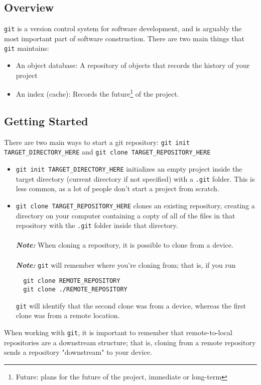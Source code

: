 \documentclass[13pt]{article}
\begin{document}
\subsection{Overview}
\texttt{git} is a version control system for software development, and is arguably the most important part of software construction. There are two main things that \texttt{git} maintains:
\begin{itemize}[label=,leftmargin=*]
\item An object database: A repository of objects that records the history of your project
\item An index (cache): Records the future\footnote{Future: plans for the future of the project, immediate or long-term} of the project.
\end{itemize}





\subsection{Getting Started}
There are two main ways to start a git repository: \texttt{git init TARGET\_DIRECTORY\_HERE} and \texttt{git clone TARGET\_REPOSITORY\_HERE}

\begin{itemize} [label=,leftmargin=*]
\item \texttt{git init TARGET\_DIRECTORY\_HERE} initializes an empty project inside the target directory (current directory if not specified) with a \texttt{.git} folder. This is less common, as a lot of people don't start a project from scratch.
\item \texttt{git clone TARGET\_REPOSITORY\_HERE} clones an existing repository, creating a directory on your computer containing a copty of all of the files in that repository with the \texttt{.git} folder inside that directory. \\ \\
  \textbf{\textit{Note:}} When cloning a repository, it is possible to clone from a device. \\ \\
  \textbf{\textit{Note:}} \texttt{git} will remember where you're cloning from; that is, if you run
\begin{verbatim}
  git clone REMOTE_REPOSITORY
  git clone ./REMOTE_REPOSITORY \end{verbatim}
\texttt{git} will identify that the second clone was from a device, whereas the first clone was from a remote location.
\end{itemize}
When working with \texttt{git}, it is important to remember that remote-to-local repositories are a downstream structure; that is, cloning from a remote repository sends a repository "downstream" to your device.
\end{document}
